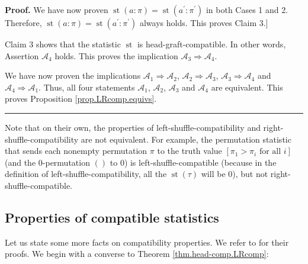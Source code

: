 \documentclass[numbers=enddot,12pt,final,onecolumn,notitlepage]{scrartcl}%
\theoremstyle{definition}
\newenvironment{proof}[1][Proof]{\noindent\textbf{#1.} }{\ \rule{0.5em}{0.5em}}
\newenvironment{verlong}{}{}
\newenvironment{vershort}{}{}
\begin{document}
\begin{verlong}
\begin{proof}
We have now proven $\operatorname*{st}\left(  a:\pi\right)
=\operatorname*{st}\left(  a^{\prime}:\pi^{\prime}\right)  $ in both Cases 1
and 2. Therefore, $\operatorname*{st}\left(  a:\pi\right)  =\operatorname*{st}%
\left(  a^{\prime}:\pi^{\prime}\right)  $ always holds. This proves Claim 3.]

Claim 3 shows that the statistic $\operatorname*{st}$ is
head-graft-compatible. In other words, Assertion $\mathcal{A}_{4}$ holds. This
proves the implication $\mathcal{A}_{3}\Longrightarrow\mathcal{A}_{4}$.

We have now proven the implications $\mathcal{A}_{1}\Longrightarrow
\mathcal{A}_{2}$, $\mathcal{A}_{2}\Longrightarrow\mathcal{A}_{3}$,
$\mathcal{A}_{3}\Longrightarrow\mathcal{A}_{4}$ and $\mathcal{A}%
_{4}\Longrightarrow\mathcal{A}_{1}$. Thus, all four statements $\mathcal{A}%
_{1}$, $\mathcal{A}_{2}$, $\mathcal{A}_{3}$ and $\mathcal{A}_{4}$ are
equivalent. This proves Proposition \ref{prop.LRcomp.equivs}.
\end{proof}
\end{verlong}

Note that on their own, the properties of left-shuffle-compatibility and
right-shuffle-compatibility are not equivalent. For example, the permutation
statistic that sends each nonempty permutation $\pi$ to the truth value
$\left[  \pi_{1}>\pi_{i}\text{ for all }i\right]  $ (and the $0$-permutation
$\left(  {}\right)  $ to $0$) is left-shuffle-compatible (because in the
definition of left-shuffle-compatibility, all the $\operatorname*{st}\left(
\tau\right)  $ will be $0$), but not right-shuffle-compatible.

\subsection{Properties of compatible statistics}

\begin{vershort}
Let us state some more facts on compatibility properties. We refer to
\cite{verlong} for their proofs. We begin with a converse to Theorem
\ref{thm.head-comp.LRcomp}:
\end{vershort}
\end{document}
